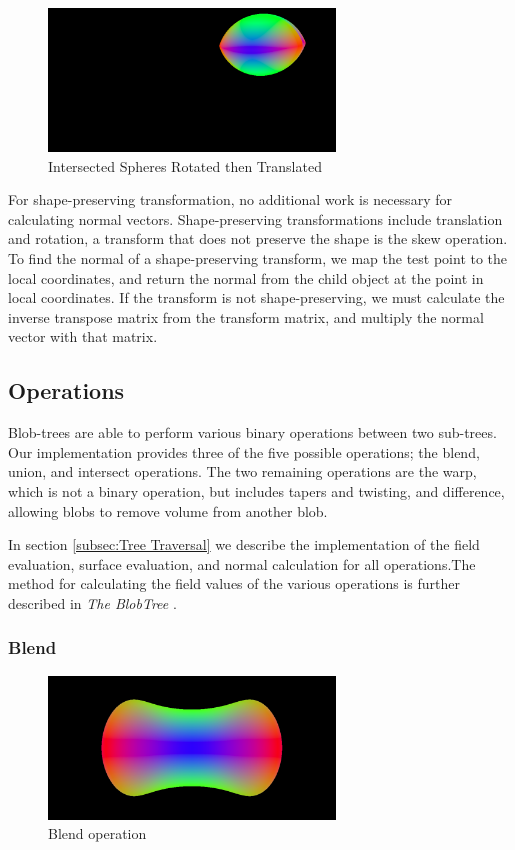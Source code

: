 \documentclass[conference]{acmsiggraph}
\begin{document}
\begin{figure}[htb]
	\centering
	\includegraphics[height=1.5in]{images/intersect_rotate.png}
	\caption{Intersected Spheres Rotated then Translated}
\end{figure}

For shape-preserving transformation, no additional work is necessary for
calculating normal vectors. Shape-preserving transformations include
translation and rotation, a transform that does not preserve the shape is the
skew operation. To find the normal of a shape-preserving transform, we map the
test point to the local coordinates, and return the normal from the child
object at the point in local coordinates. If the transform is not
shape-preserving, we must calculate the inverse transpose matrix from the
transform matrix, and multiply the normal vector with that matrix.

\subsection{Operations}
Blob-trees are able to perform various binary operations between two
sub-trees. Our implementation provides three of the five possible operations;
the blend, union, and intersect operations. The two remaining operations are
the warp, which is not a binary operation, but includes tapers and twisting,
and difference, allowing blobs to remove volume from another blob.

In section \ref{subsec:Tree Traversal} we describe the implementation of the
field evaluation, surface evaluation, and normal calculation for all
operations.The method for calculating the field values of the various
operations is further described in \textit{The BlobTree} \cite{Wyvill}.

\subsubsection{Blend}
\begin{figure}[htbp]
	\centering
	\includegraphics[height=1.5in]{images/blend.png}
	\caption{Blend operation}
	\label{fig:Blend}
\end{figure}
\end{document}
